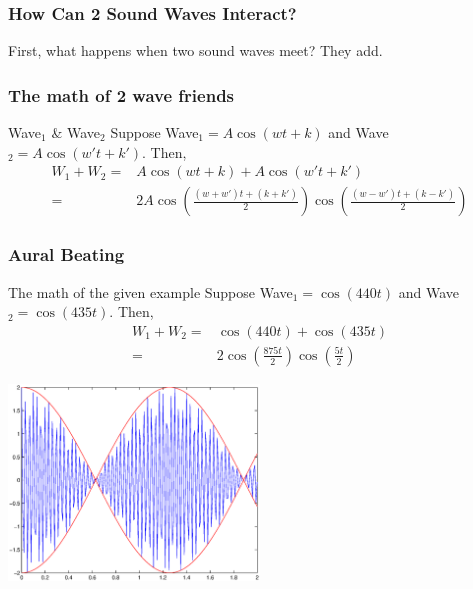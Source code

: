 \documentclass[10pt,unknownkeysallowed]{beamer}
\begin{document}
\begin{frame}
\frametitle{How Can 2 Sound Waves Interact?}
\begin{block}{First, what happens when two sound waves meet?}
They add.
\end{block}

\end{frame}

\begin{frame}
\frametitle{The math of 2 wave friends}
\begin{block}{Wave$_1$ \& Wave$_2$}
Suppose Wave$_1 = A\cos(wt + k)$ and Wave$_2 = A\cos(w't + k')$. Then,
\begin{align*}
W_1 + W_2 =&A\cos(wt + k) + A\cos(w't + k')\\
=&2A\cos(\frac{(w+w')t+(k+k')}{2})\cos(\frac{(w-w')t +(k- k')}{2})
\end{align*}
\end{block}

\end{frame}

\begin{frame}
\frametitle{Aural Beating}
\begin{block}{The math of the given example}
Suppose Wave$_1 = \cos(440t)$ and Wave$_2 = \cos(435t)$. Then,
\begin{align*}
W_1 + W_2 =&\cos(440t) + \cos(435t)\\
=&2\cos(\frac{875t}{2})\cos(\frac{5t}{2})
\end{align*}
\end{block}

\begin{block}{}
\center \includegraphics[width = 0.5\textwidth]{BeatingWave.eps}
\end{block}


\end{frame}
\end{document}
